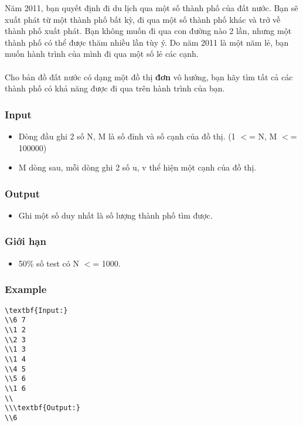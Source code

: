 



   Năm 2011, bạn quyết định đi du lịch qua một số thành phố của đất nước. Bạn sẽ xuất phát từ một thành phố bất kỳ, đi qua một số thành phố khác và trở về thành phố xuất phát. Bạn không muốn đi qua con đường nào 2 lần, nhưng một thành phố có thể được thăm nhiều lần tùy ý. Do năm 2011 là một năm lẻ, bạn muốn hành trình của mình đi qua một số lẻ các cạnh.   
\\
\\   Cho bản đồ đất nước có dạng một đồ thị   \textbf{    đơn   }   vô hướng, bạn hãy tìm tất cả các thành phố có khả năng được đi qua trên hành trình của bạn.  

\subsubsection{   Input  }
\begin{itemize}
	\item     Dòng đầu ghi 2 số N, M là số đỉnh và số cạnh của đồ thị. (1 $<$= N, M $<$= 100000)   
\end{itemize}
\begin{itemize}
	\item     M dòng sau, mỗi dòng ghi 2 số u, v thể hiện một cạnh của đồ thị.   
\end{itemize}

\subsubsection{   Output  }
\begin{itemize}
	\item     Ghi một số duy nhất là số lượng thành phố tìm được.   
\end{itemize}

\subsubsection{   Giới hạn  }
\begin{itemize}
	\item     50\% số test có N $<$= 1000.   
\end{itemize}

\subsubsection{   Example  }
\begin{verbatim}
\textbf{Input:}
\\6 7
\\1 2
\\2 3
\\1 3
\\1 4
\\4 5
\\5 6
\\1 6
\\
\\\textbf{Output:}
\\6\end{verbatim}